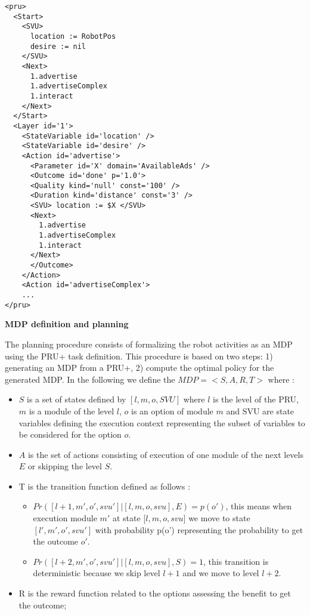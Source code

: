 \vspace{-1em}
\begin{small}
\begin{verbatim}
<pru>
  <Start>
    <SVU>
      location := RobotPos
      desire := nil
    </SVU>
    <Next> 
      1.advertise 
      1.advertiseComplex 
      1.interact
    </Next>
  </Start>
  <Layer id='1'>
    <StateVariable id='location' />
    <StateVariable id='desire' />
    <Action id='advertise'>
      <Parameter id='X' domain='AvailableAds' />
      <Outcome id='done' p='1.0'>
      <Quality kind='null' const='100' />
      <Duration kind='distance' const='3' />
      <SVU> location := $X </SVU>
      <Next> 
        1.advertise 
        1.advertiseComplex 
        1.interact
      </Next>
      </Outcome>
    </Action>
    <Action id='advertiseComplex'>
    ...
</pru>
\end{verbatim}
\end{small}

\vspace{1em}
\noindent
{\bf MDP definition and planning}

The planning procedure consists of formalizing the robot activities as an MDP using the PRU+ task definition. This procedure is based on two steps: 1) generating an MDP from a PRU+, 2) compute the optimal policy for the generated MDP.
In the following we define the $MDP = <S, A, R, T> $ where : 
\begin{itemize}
\item $S$ is a set of states defined by $[l, m, o, SVU]$ where $l$ is the level of the PRU, $m$ is a module of the level $l$, $o$ is an option of module $m$ and SVU are  state variables defining the execution context representing the subset of variables to be considered for the option $o$. 
\item $A$ is the set of actions consisting of execution of one module of the next levels $E$ or skipping the level  $S$. 
\item T is the transition function defined as follows : 
\begin{itemize}
\item $ Pr([l+1,m',o',svu'] | [l,m,o,svu], E) = p(o')$, this means when execution module $m'$ at state [$l,m,o,svu]$ we move to state $[l',m',o',svu']$ with probability p(o') representing the probability to get the outcome $o'$. %
\item $Pr([l+2, m' , o' , svu' ] | [l,m,o,svu], S) = 1$, this transition is deterministic because we skip level $l+1$ and we move to level $l+2$. 
\end{itemize}
\item R is the reward function related to the options assessing the benefit to get the outcome; 
\end{itemize}

